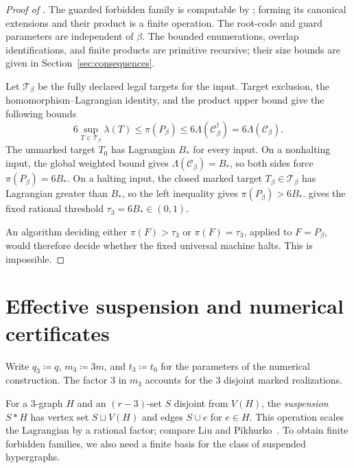 \documentclass[10pt]{article}
\numberwithin{equation}{section}
\theoremstyle{definition}
\begin{document}
\begin{proof}[Proof of ]
The guarded forbidden family is computable by
; forming its canonical
extensions and their product is a finite operation. The root-code and guard parameters are independent of $\beta$. The bounded enumerations, overlap identifications, and finite products are primitive recursive; their size bounds are given in Section~\ref{sec:consequences}.

Let $\mathcal T_\beta$ be the fully declared legal targets for the input. Target exclusion, the homomorphism--Lagrangian identity, and the product upper bound give the following bounds
\[
 6\sup_{T\in\mathcal T_\beta}\lambda(T)
 \le\pi(P_\beta)
 \le6\Lambda(\mathcal C^\dagger_\beta)
 =6\Lambda(\mathcal C_\beta).
\]
The unmarked target $T_0$ has Lagrangian $B_*$ for every input. On a nonhalting input, the global weighted bound gives $\Lambda(\mathcal C_\beta)=B_*$, so both sides force $\pi(P_\beta)=6B_*$. On a halting input, the closed marked target $T_\beta\in\mathcal T_\beta$ has Lagrangian greater than $B_*$, so the left inequality gives $\pi(P_\beta)>6B_*$.
 gives the fixed rational
threshold $\tau_3=6B_*\in(0,1)$.

An algorithm deciding either $\pi(F)>\tau_3$ or $\pi(F)=\tau_3$, applied to $F=P_\beta$, would therefore decide whether the fixed universal machine halts. This is impossible.
\end{proof}

\section{Effective suspension and numerical certificates}\label{sec:v3-suspension}

Write $q_3\coloneqq q$, $m_3\coloneqq3m$, and $t_3\coloneqq t_0$ for the parameters of the numerical construction. The factor $3$ in $m_3$ accounts for the 3 disjoint marked realizations.

For a $3$-graph $H$ and an $(r-3)$-set $S$ disjoint from $V(H)$, the \emph{suspension} $S*H$ has vertex set $S\sqcup V(H)$ and edges $S\cup e$ for $e\in H$. This operation scales the Lagrangian by a rational factor; compare Liu and Pikhurko~\cite[Proposition 2.3]{LiuPikhurko2023}. To obtain finite forbidden families, we also need a finite basis for the class of suspended hypergraphs.
\end{document}
